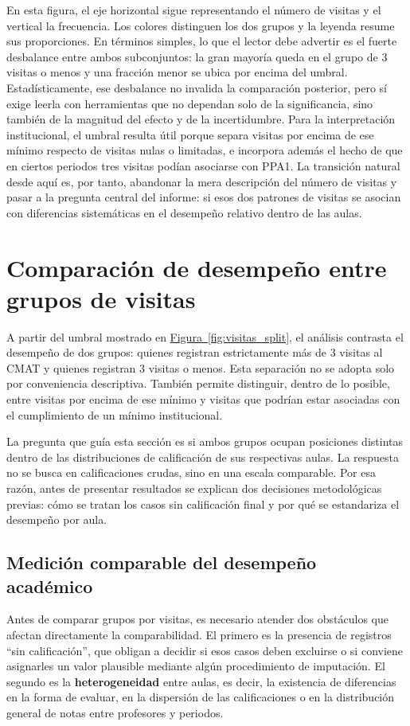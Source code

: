 \documentclass[10pt,letterpaper]{article} %
\numberwithin{figure}{subsection}
\begin{document}
En esta figura, el eje horizontal sigue representando el número de visitas y el vertical la frecuencia. Los colores distinguen los dos grupos y la leyenda resume sus proporciones. En términos simples, lo que el lector debe advertir es el fuerte desbalance entre ambos subconjuntos: la gran mayoría queda en el grupo de 3 visitas o menos y una fracción menor se ubica por encima del umbral. Estadísticamente, ese desbalance no invalida la comparación posterior, pero sí exige leerla con herramientas que no dependan solo de la significancia, sino también de la magnitud del efecto y de la incertidumbre. Para la interpretación institucional, el umbral resulta útil porque separa visitas por encima de ese mínimo respecto de visitas nulas o limitadas, e incorpora además el hecho de que en ciertos periodos tres visitas podían asociarse con PPA1. La transición natural desde aquí es, por tanto, abandonar la mera descripción del número de visitas y pasar a la pregunta central del informe: si esos dos patrones de visitas se asocian con diferencias sistemáticas en el desempeño relativo dentro de las aulas.



\FloatBarrier
\section{Comparación de desempeño entre grupos de visitas}
A partir del umbral mostrado en \hyperref[fig:visitas_split]{Figura~\ref{fig:visitas_split}}, el análisis contrasta el desempeño de dos grupos: quienes registran estrictamente más de 3 visitas al CMAT y quienes registran 3 visitas o menos. Esta separación no se adopta solo por conveniencia descriptiva. También permite distinguir, dentro de lo posible, entre visitas por encima de ese mínimo y visitas que podrían estar asociadas con el cumplimiento de un mínimo institucional.

La pregunta que guía esta sección es si ambos grupos ocupan posiciones distintas dentro de las distribuciones de calificación de sus respectivas aulas. La respuesta no se busca en calificaciones crudas, sino en una escala comparable. Por esa razón, antes de presentar resultados se explican dos decisiones metodológicas previas: cómo se tratan los casos sin calificación final y por qué se estandariza el desempeño por aula.

\subsection{Medición comparable del desempeño académico}
Antes de comparar grupos por visitas, es necesario atender dos obstáculos que afectan directamente la comparabilidad. El primero es la presencia de registros ``sin calificación'', que obligan a decidir si esos casos deben excluirse o si conviene asignarles un valor plausible mediante algún procedimiento de imputación. El segundo es la \textbf{heterogeneidad} entre aulas, es decir, la existencia de diferencias en la forma de evaluar, en la dispersión de las calificaciones o en la distribución general de notas entre profesores y periodos.
\end{document}
